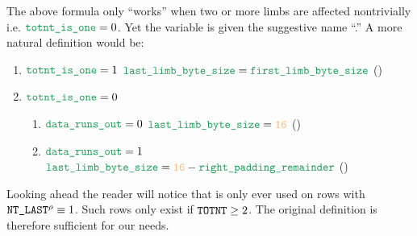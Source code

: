 The above formula only ``works'' when two or more limbs are affected nontrivially i.e. $\locTotntIsOne = 0$.
Yet the variable is given the suggestive name ``\locLastLimbByteSize.''
A more natural definition would be:
\begin{enumerate}
	\item \If $\locTotntIsOne = 1$ \Then $\locLastLimbByteSize = \locFirstLimbByteSize$ (\trash)
	\item \If $\locTotntIsOne = 0$ \Then
		\begin{enumerate}
			\item \If $\locDataRunsOut = 0$ \Then $\locLastLimbByteSize = \llarge$ (\trash)
			\item \If $\locDataRunsOut = 1$ \Then $\locLastLimbByteSize = \llarge - \locRt$ (\trash)
		\end{enumerate}
\end{enumerate}
Looking ahead the reader will notice that \locLastLimbByteSize{} is only ever used on rows with $\texttt{NT\_LAST}^\rho \equiv 1$.
Such rows only exist if $\texttt{TOTNT} \geq 2$.
The original definition is therefore sufficient for our needs. 
